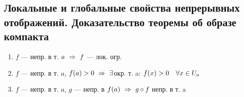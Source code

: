 \documentclass[main]{subfiles}
\begin{document}
	\newpage
	\subsection{Локальные и глобальные свойства непрерывных отображений. Доказательство теоремы об образе компакта}

	\begin{theorem}
		\begin{enumerate}
			\item $f$ --- непр. в т. $a \ \Rightarrow\  f$ --- лок. огр.
			\item $f$ --- непр. в т. $a$, $f(a) > 0 \ \Rightarrow\  \exists$окр. т. a: $f(x) > 0\quad \forall x \in U_a$
			\item $f$ --- непр. в т. $a$, $g$ --- непр. в $f(a) \ \Rightarrow\  g \circ f$ непр. в т. a
		\end{enumerate}
	\end{theorem}
\end{document}
